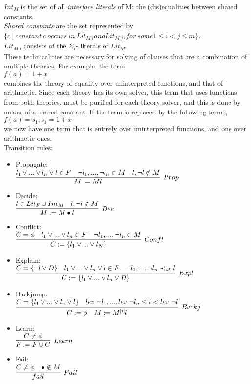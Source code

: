 \documentclass{report}
\begin{document}
$Int_M$ is the set of all \textit{interface literals} of M:
the (dis)equalities between shared constants. \\
\textit{Shared constants} are the set represented by \\
$\{c\ |\ constant\ c\ occurs\ in\ Lit_{M|i} and Lit_{M|j}, 
for\ some 1 \leq i < j \leq m\}$. \\
$Lit_{M|i}$ consists of the $\Sigma_i$- literals of $Lit_M$. \\
These technicalities are necessary for solving of clauses 
that are a combination of multiple theories. 
For example, the term \\
$f(a) = 1 + x$ \\
combines the theory of equality over uninterpreted functions,
and that of arithmetic. Since each theory has its own solver,
this term that uses functions from both theories, must be 
purified for each theory solver, and this is done by means of
a shared constant. If the term is replaced by the following 
terms, \\
$f(a) = s_1, s_1 = 1 + x$ \\
we now have one term that is entirely over uninterpreted 
functions, and one over arithmetic ones. \\
Transition rules:
\begin{itemize}
	\item Propagate:\\ $\infer[Prop]{M := Ml}{l_1 \lor ... \lor l_n \lor l \in F 
		& \neg l_1,...,\neg l_n \in M & l, \neg l \notin M}$ 
	\item Decide:\\ $\infer[Dec]{M := M \bullet l}
	{l \in Lit_F \cup Int_M & l, \neg l \notin M}$ \\
	\item Conflict:\\ $\infer[Confl]{C:=\{l_1 \lor ... \lor l_N\}}
	{C = \phi & l_1 \lor ... \lor l_n \in F & \neg l_1,...,\neg l_n \in M}$ 
	\item Explain:\\ $\infer[Expl]{C := \{l_1 \lor ... \lor l_n \lor D\}}
	{C = \{\neg l \lor D\} & l_1 \lor ... \lor l_n \lor l \in F 
		& \neg l_1,...,\neg l_n \prec_M l}$
	\item Backjump:\\ $\infer[Backj]{C := \phi\ \ \ M := M^{[i]}l}
	{C = \{l_1 \lor ... \lor l_n \lor l\} & 
		lev\ \neg l_1, ... , lev\ \neg l_n \leq i < lev\ \neg l}$
	\item Learn: \\ $\infer[Learn]{F := F \cup C}{C \neq \phi}$
	\item Fail:\\ $\infer[Fail]{fail}{C \neq \phi & \bullet \notin M}$
\end{itemize}
\end{document}
